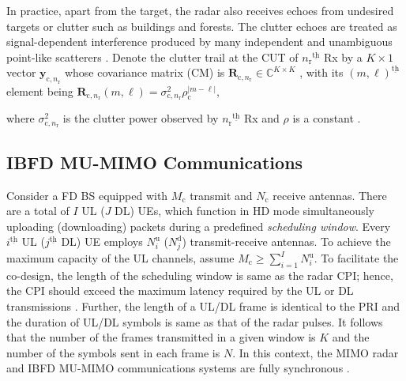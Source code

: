 \documentclass[9pt,journal]{IEEEtran}
\newcommand{\paren}[1]{\left({#1}\right)}
\newcommand{\bracket}[1]{{\left [{#1}\right ]}}
\newcommand{\braces}[1]{{\left\{ {#1}\right\}}}
\newcommand{\ith}[1]    {{#1}^{\underline{\text{th}}}}
\newcommand{\rr}{_\mathrm{r}}
\newcommand{\cc}{_\mathrm{c}}
\theoremstyle{definition}
\begin{document}
In practice, apart from the target, the radar also receives echoes from undesired targets or clutter such as buildings and forests. %
The clutter echoes are treated as signal-dependent interference produced by many independent and unambiguous point-like scatterers \cite{NaghshTSP2017}. Denote the clutter trail at the CUT of $\ith{n\rr}$ Rx by a $K \times 1$ vector $\mathbf{y}_{\mathrm{c},n\rr}$ whose covariance matrix (CM) is $\mathbf{R}_{\textrm{c},n\rr}\in\mathbb{C}^{\mathit{K}\times K}$%
, with its $\ith{\paren{m,\ell}}$ element being $\mathbf{R}_{\textrm{c},n\rr}\paren{m,\ell}=\sigma^2_{\textrm{c},n\rr}\rho_{\mathrm{c}}^{\lvert m-\ell\rvert}$,

where $\sigma^2_{\textrm{c},n\rr}$ is the clutter power observed by $\ith{n\rr}$ Rx and $\rho$ is a constant \cite{NaghshTSP2017}. 
\vspace{-1em}
\subsection{IBFD MU-MIMO Communications}
Consider a FD BS equipped with $\mathit{M}_\textrm{c}$ transmit and $\mathit{N}_{\textrm{c}}$ receive antennas. There are a total of $\mathit{I}$ UL ($\mathit{J}$ DL) UEs, which function in HD mode simultaneously uploading (downloading) packets during a predefined \textit{scheduling  window}. Every $\ith{i}$ UL ($\ith{j}$ DL) UE employs $\mathit{N}^{\textrm{u}}_i$ ($\mathit{N}^{\textrm{d}}_j$) transmit-receive antennas. %
To achieve the maximum capacity of the UL channels, assume $\mathit{M}\cc\geq\sum_{i=1}^{\mathit{I}}\mathit{N}^{\textrm{u}}_i$\cite{tse2005fundamentals}. To facilitate the co-design, the length of the scheduling window is same as the radar CPI; hence, the CPI should exceed the maximum latency required by the UL or DL transmissions \cite{ShiftMIMO}. Further, the length of a UL/DL frame is identical to the PRI and the duration of UL/DL symbols is same as that of the radar pulses. It follows that the number of the frames transmitted in a given window is $\mathit{K}$ and the number of the symbols sent in each frame is $\mathit{N}$. %
In this context, the MIMO radar and IBFD MU-MIMO communications systems are fully synchronous \cite{MCMIMO_RadComm}. 
\end{document}
